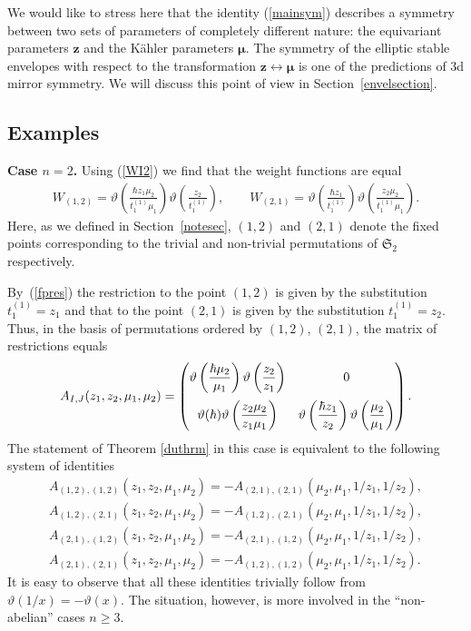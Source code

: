\documentclass[pdftex]{sigma}
\def\zz{{\boldsymbol z}}
\def\mub{{\boldsymbol\mu}}
\let\thi\vartheta
\numberwithin{equation}{section}
\begin{document}
\begin{Note}
We would like to stress here that the identity (\ref{mainsym}) describes a symmetry between two sets of parameters of completely different nature: the
equivariant parameters $\zz$ and the K\"ahler parameters $\mub$. The symmetry of the elliptic stable envelopes with respect to the transformation $\zz\leftrightarrow \mub$ is one of the predictions of 3d mirror symmetry. We will discuss this point of view in Section~\ref{envelsection}.
\end{Note}

\subsection{Examples} \label{exsection}

\textbf{Case $n=2$.} Using (\ref{WI2}) we find that the weight functions are equal
\begin{gather*}
W_{(1,2)}=\thi \left( {\frac {\hbar z_{{1}}\mu_{{2}}}{t_{{1}}^{(1)} \mu_{{1}}}} \right)
\thi \left( {\frac {z_{{2}}}{t_1^{(1)} }} \right), \qquad W_{(2,1)}=\thi \left( {\frac {\hbar z_{{1}}}{t_1^{(1)} }} \right) \thi \left( {
 \frac {z_{{2}}\mu_{{2}}}{t_1^{(1)} \mu_{{1}}}} \right).
\end{gather*}
Here, as we defined in Section~\ref{notesec}, $(1,2)$ and $(2,1)$ denote the fixed points corresponding to the trivial and non-trivial permutations of $\mathfrak{S}_{2}$ respectively.

By~(\ref{fpres}) the restriction to the point $(1,2)$ is given by the substitution $t_1^{(1)} =z_{{1}}$ and that to the point $(2,1)$ is given by the substitution $t_1^{(1)} =z_{{2}}$. Thus, in the basis of permutations ordered by $(1,2)$, $(2,1)$, the matrix of restrictions equals
\begin{gather*}
A_{I,J}(z_1,z_2,\mu_1,\mu_2)=
\left( \begin{matrix} \thi \left( {\dfrac {\hbar \mu_{{2}}}{\mu_{{1}
}}} \right) \thi \left( {\dfrac {z_{{2}}}{z_{{1}}}} \right) & 0
\vspace{2mm}\\ \thi( \hbar ) \thi \left( {\dfrac {z_
 {{2}}\mu_{{2}}}{z_{{1}}\mu_{{1}}}} \right) & \thi \left( {\dfrac {\hbar z_
 {{1}}}{z_{{2}}}} \right) \thi \left( {\dfrac {\mu_{{2}}}{\mu_{{1}}}} \right) \end{matrix} \right).
\end{gather*}
The statement of Theorem \ref{duthrm} in this case is equivalent to the following system of identities
\begin{gather*}
A_{(1, 2), (1, 2)}(z_1,z_2,\mu_1,\mu_2) =- A_{(2, 1), (2, 1)}(\mu_2,\mu_1,1/z_1,1/z_2),\\
A_{(1, 2), (2, 1)}(z_1,z_2,\mu_1,\mu_2) =- A_{(1, 2), (2, 1)}(\mu_2,\mu_1,1/z_1,1/z_2),\\
A_{(2,1), (1, 2)}(z_1,z_2,\mu_1,\mu_2) =- A_{(2, 1), (1, 2)}(\mu_2,\mu_1,1/z_1,1/z_2),\\
A_{(2, 1), (2, 1)}(z_1,z_2,\mu_1,\mu_2) =- A_{(1, 2), (1, 2)}(\mu_2,\mu_1,1/z_1,1/z_2).
\end{gather*}
It is easy to observe that all these identities trivially follow from $\thi (1/x)=-\thi (x)$. The situation, however, is more involved in the ``non-abelian'' cases $n\geq 3$.
\end{document}

